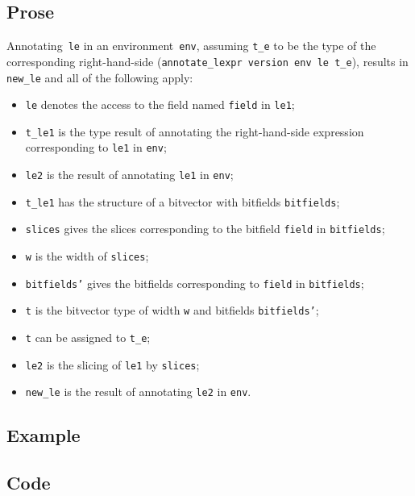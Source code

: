 \documentclass{book}
\begin{document}
    \subsection{Prose}
   Annotating~\texttt{le} in an environment~\texttt{env}, assuming
\texttt{t\_e} to be the type of the corresponding right-hand-side
(\texttt{annotate\_lexpr version env le t\_e}), results in \texttt{new\_le} and
all of the following apply:
   \begin{itemize}
   \item \texttt{le} denotes the access to the field named \texttt{field} in \texttt{le1};
   \item \texttt{t\_le1} is the type result of annotating the right-hand-side expression corresponding to \texttt{le1} in \texttt{env};
   \item \texttt{le2} is the result of annotating \texttt{le1} in \texttt{env};
   \item \texttt{t\_le1} has the structure of a bitvector with bitfields \texttt{bitfields};
   \item \texttt{slices} gives the slices corresponding to the bitfield \texttt{field} in
      \texttt{bitfields};
   \item \texttt{w} is the width of \texttt{slices};
   \item \texttt{bitfields'} gives the bitfields corresponding to \texttt{field} in \texttt{bitfields};
   \item \texttt{t} is the bitvector type of width \texttt{w} and bitfields \texttt{bitfields'};
   \item \texttt{t} can be assigned to \texttt{t\_e};
   \item \texttt{le2} is the slicing of \texttt{le1} by \texttt{slices};
   \item \texttt{new\_le} is the result of annotating \texttt{le2} in \texttt{env}.
   \end{itemize}

  \subsection{Example}

  \subsection{Code}
\end{document}
